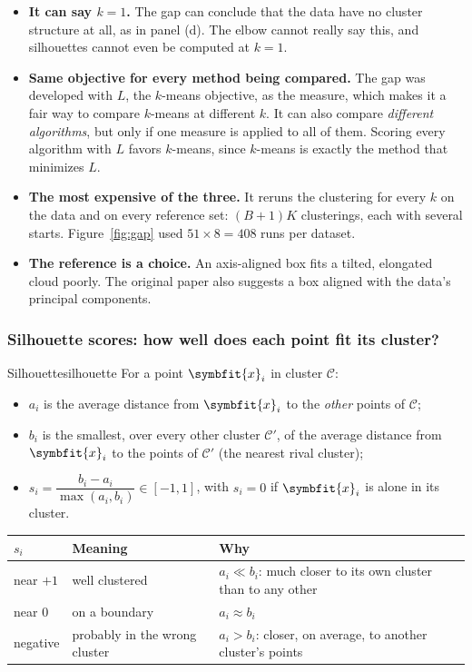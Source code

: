 \documentclass[11pt]{article}
\newcommand{\bm}[1]{\symbfit{#1}}
\newcommand{\vx}{\bm{x}}
\begin{document}
\begin{careful}
\begin{itemize}[nosep,leftmargin=*]
\item \textbf{It can say $k=1$.} The gap can conclude that the data have no cluster structure at all, as in panel (d). The elbow cannot really say this, and silhouettes cannot even be computed at $k=1$.
\item \textbf{Same objective for every method being compared.} The gap was developed with $L$, the $k$-means objective, as the measure, which makes it a fair way to compare $k$-means at different $k$. It can also compare \emph{different algorithms}, but only if one measure is applied to all of them. Scoring every algorithm with $L$ favors $k$-means, since $k$-means is exactly the method that minimizes $L$.
\item \textbf{The most expensive of the three.} It reruns the clustering for every $k$ on the data and on every reference set: $(B+1)K$ clusterings, each with several starts. Figure~\ref{fig:gap} used $51\times8=408$ runs per dataset.
\item \textbf{The reference is a choice.} An axis-aligned box fits a tilted, elongated cloud poorly. The original paper also suggests a box aligned with the data's principal components.
\end{itemize}
\end{careful}

\subsubsection*{Silhouette scores: how well does each point fit its cluster?}

\begin{definition}{Silhouette}{silhouette}
For a point $\vx_i$ in cluster $\mathcal C$:
\begin{itemize}[nosep]
\item $a_i$ is the average distance from $\vx_i$ to the \emph{other} points of $\mathcal C$;
\item $b_i$ is the smallest, over every other cluster $\mathcal C'$, of the average distance from $\vx_i$ to the points of $\mathcal C'$ (the nearest rival cluster);
\item $s_i=\dfrac{b_i-a_i}{\max(a_i,b_i)}\in[-1,1]$, with $s_i=0$ if $\vx_i$ is alone in its cluster.
\end{itemize}
\end{definition}

\begin{center}
\small
\renewcommand{\arraystretch}{1.2}
\begin{tabular}{@{}lll@{}}
\toprule
$s_i$ & Meaning & Why\\
\midrule
near $+1$ & well clustered & $a_i\ll b_i$: much closer to its own cluster than to any other\\
near $0$ & on a boundary & $a_i\approx b_i$\\
negative & probably in the wrong cluster & $a_i>b_i$: closer, on average, to another cluster's points\\
\bottomrule
\end{tabular}
\end{center}
\end{document}

